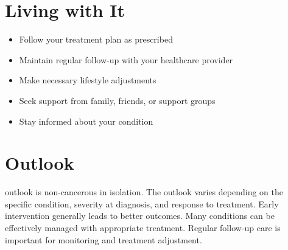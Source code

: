 \section{Living with It}
\begin{itemize}[noitemsep]
  \item Follow your treatment plan as prescribed
  \item Maintain regular follow-up with your healthcare provider
  \item Make necessary lifestyle adjustments
  \item Seek support from family, friends, or support groups
  \item Stay informed about your condition
\end{itemize}
\section{Outlook}
outlook is non-cancerous in isolation. The outlook varies depending on the specific condition, severity at diagnosis, and response to treatment. Early intervention generally leads to better outcomes. Many conditions can be effectively managed with appropriate treatment. Regular follow-up care is important for monitoring and treatment adjustment.
